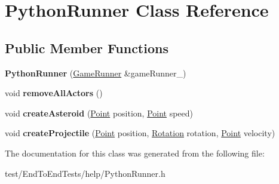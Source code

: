 \hypertarget{classPythonRunner}{}\section{Python\+Runner Class Reference}
\label{classPythonRunner}
\subsection*{Public Member Functions}
\begin{DoxyCompactItemize}
\item 
{\bfseries Python\+Runner} (\hyperlink{classGameRunner}{Game\+Runner} \&game\+Runner\+\_\+)\hypertarget{classPythonRunner_a876bad5f9c2e62bbefddc6146ea4e605}{}\label{classPythonRunner_a876bad5f9c2e62bbefddc6146ea4e605}

\item 
void {\bfseries remove\+All\+Actors} ()\hypertarget{classPythonRunner_a21d9584bae7918063dd501c45ebb93e9}{}\label{classPythonRunner_a21d9584bae7918063dd501c45ebb93e9}

\item 
void {\bfseries create\+Asteroid} (\hyperlink{classPoint}{Point} position, \hyperlink{classPoint}{Point} speed)\hypertarget{classPythonRunner_ad0e6ff54be0fe1f6dc788fb13d6ed6e0}{}\label{classPythonRunner_ad0e6ff54be0fe1f6dc788fb13d6ed6e0}

\item 
void {\bfseries create\+Projectile} (\hyperlink{classPoint}{Point} position, \hyperlink{classRotation}{Rotation} rotation, \hyperlink{classPoint}{Point} velocity)\hypertarget{classPythonRunner_a73db4b5af3163bda029d6ab8c9464c2d}{}\label{classPythonRunner_a73db4b5af3163bda029d6ab8c9464c2d}

\end{DoxyCompactItemize}


The documentation for this class was generated from the following file\+:\begin{DoxyCompactItemize}
\item 
test/\+End\+To\+End\+Tests/help/Python\+Runner.\+h\end{DoxyCompactItemize}
